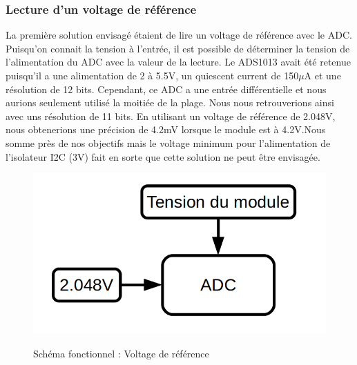 \documentclass[12pt,letterpaper]{article}
\begin{document}
\begin{normalsize}
				\subsubsection{Lecture d'un voltage de r\'{e}f\'{e}rence}
					La premi\`{e}re solution envisag\'{e} \'{e}taient de lire un voltage de r\'{e}f\'{e}rence avec le ADC. Puisqu'on connait la tension \`{a} l'entr\'{e}e, il est possible de d\'{e}terminer la tension de l'alimentation du ADC avec la valeur de la lecture. Le ADS1013 avait \'{e}t\'{e} retenue puisqu'il a une alimentation de 2 \`{a} 5.5V, un quiescent current de 150$\mu$A et une r\'{e}solution de 12 bits. Cependant, ce ADC a une entr\'{e}e diff\'{e}rentielle et nous aurions seulement utilis\'{e} la moiti\'{e}e de la plage. Nous nous retrouverions ainsi avec uns r\'{e}solution de 11 bits. En utilisant un voltage de r\'{e}f\'{e}rence de 2.048V, nous obtenerions une pr\'{e}cision de 4.2mV lorsque le module est \`{a} 4.2V.Nous somme pr\`{e}s de nos objectifs mais le voltage minimum pour l'alimentation de l'isolateur I2C (3V) fait en sorte que cette solution ne peut \^{e}tre envisag\'{e}e.
					\begin{figure}[h]
						\centering
						\includegraphics[scale=0.3]{Voltage_reference} \\ \vspace{0cm}
						\caption{Sch\'{e}ma fonctionnel : Voltage de r\'{e}f\'{e}rence }
						\label{fig:schema_voltage_ref}
					\end{figure}

				\newpage

\end{normalsize}
\end{document}
